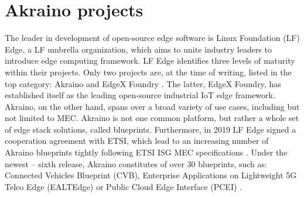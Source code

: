 \documentclass[12pt,a4paper,twoside]{report}
\begin{document}
\section{Akraino projects}
The leader in development of open-source edge software is Linux Foundation (LF) Edge, a LF umbrella organization, which aims to unite industry leaders to introduce edge computing framework. LF Edge identifies three levels of maturity within their projects. Only two projects are, at the time of writing, listed in the top category: Akraino and EdgeX Foundry \cite{lf-edge-web}. The latter, EdgeX Foundry, has established itself as the leading open-source industrial IoT edge framework. Akraino, on the other hand, spans over a broad variety of use cases, including but not limited to MEC. Akraino is not one common platform, but rather a whole set of edge stack solutions, called blueprints. Furthermore, in 2019 LF Edge signed a cooperation agreement with ETSI, which lead to an increasing number of Akraino blueprints tightly following ETSI ISG MEC specifications \cite{sabella-mec-sw-dev}. Under the newest – sixth release, Akraino constitutes of over 30 blueprints, such as: Connected Vehicles Blueprint (CVB), Enterprise Applications on Lightweight 5G Telco Edge (EALTEdge) or Public Cloud Edge Interface (PCEI) \cite{lf-edge-web}. 
\end{document}
